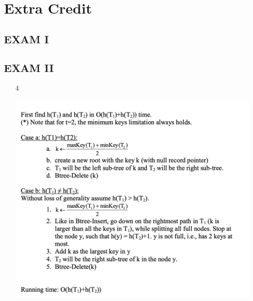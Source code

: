 \documentclass[a4paper, 11pt]{article}
\begin{document}
\section{Extra Credit}
\subsection{EXAM I}
\subsection{EXAM II}
\begin{itemize}
\item[4] 

\includegraphics[width=\textwidth]{4.png}
\end{itemize}
\end{document}
